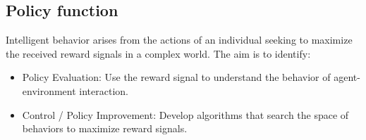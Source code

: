 \subsection{Policy function}
\label{section:MDP_QL-policy_function}

Intelligent behavior arises from the actions of an individual seeking to maximize the received reward signals in a complex world. The aim is to identify:

\begin{itemize}
    \item Policy Evaluation: Use the reward signal to understand the behavior of agent-environment interaction.
    \item Control / Policy Improvement: Develop algorithms that search the space of behaviors to maximize reward signals.
\end{itemize}

